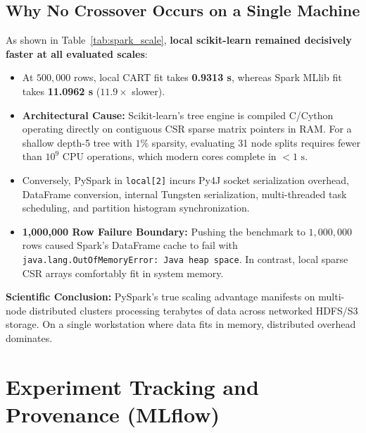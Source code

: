 \documentclass[11pt,a4paper]{article}
\begin{document}
\subsection{Why No Crossover Occurs on a Single Machine}
As shown in Table~\ref{tab:spark_scale}, \textbf{local scikit-learn remained decisively faster at all evaluated scales}:
\begin{itemize}[noitemsep,topsep=2pt]
    \item At $500{,}000$ rows, local CART fit takes \textbf{0.9313 s}, whereas Spark MLlib fit takes \textbf{11.0962 s} ($11.9\times$ slower).
    \item \textbf{Architectural Cause:} Scikit-learn's tree engine is compiled C/Cython operating directly on contiguous CSR sparse matrix pointers in RAM. For a shallow depth-5 tree with $1\%$ sparsity, evaluating 31 node splits requires fewer than $10^9$ CPU operations, which modern cores complete in $< 1\text{ s}$.
    \item Conversely, PySpark in \texttt{local[2]} incurs Py4J socket serialization overhead, DataFrame conversion, internal Tungsten serialization, multi-threaded task scheduling, and partition histogram synchronization.
    \item \textbf{1,000,000 Row Failure Boundary:} Pushing the benchmark to $1{,}000{,}000$ rows caused Spark's DataFrame cache to fail with \texttt{java.lang.OutOfMemoryError: Java heap space}. In contrast, local sparse CSR arrays comfortably fit in system memory.
\end{itemize}

\noindent\textbf{Scientific Conclusion:} PySpark's true scaling advantage manifests on multi-node distributed clusters processing terabytes of data across networked HDFS/S3 storage. On a single workstation where data fits in memory, distributed overhead dominates.

\section{Experiment Tracking and Provenance (MLflow)}
\label{sec:mlflow}
\end{document}
